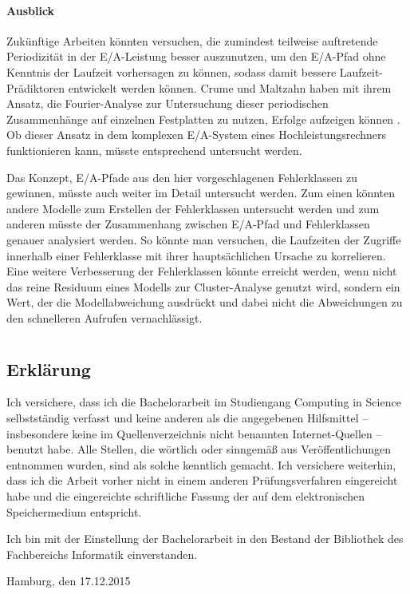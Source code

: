 \documentclass[
	12pt,
	a4paper,
	BCOR10mm,
	DIV14,
	listof=totoc,
	bibliography=totoc,
	headsepline
]{scrreprt}
\begin{document}
\subsubsection{Ausblick}
Zukünftige Arbeiten könnten versuchen, die zumindest teilweise auftretende Periodizität in der E/A-Leistung besser auszunutzen, um den E/A-Pfad ohne Kenntnis der Laufzeit vorhersagen zu können, sodass damit bessere Laufzeit-Prädiktoren entwickelt werden können. 
Crume und Maltzahn haben mit ihrem Ansatz, die Fourier-Analyse zur Untersuchung dieser periodischen Zusammenhänge auf einzelnen Festplatten zu nutzen, Erfolge aufzeigen können \cite{Crume:2013:FML:2538542.2538561}.
Ob dieser Ansatz in dem komplexen E/A-System eines Hochleistungsrechners funktionieren kann, müsste entsprechend untersucht werden.\medskip

Das Konzept, E/A-Pfade aus den hier vorgeschlagenen Fehlerklassen zu gewinnen, müsste auch weiter im Detail untersucht werden.
Zum einen könnten andere Modelle zum Erstellen der Fehlerklassen untersucht werden und zum anderen müsste der Zusammenhang zwischen E/A-Pfad und Fehlerklassen genauer analysiert werden. So könnte man versuchen, die Laufzeiten der Zugriffe innerhalb einer Fehlerklasse mit ihrer hauptsächlichen Ursache zu korrelieren.\\
Eine weitere Verbesserung der Fehlerklassen könnte erreicht werden, wenn nicht das reine Residuum eines Modells zur Cluster-Analyse genutzt wird, sondern ein Wert, der die Modellabweichung ausdrückt und dabei nicht die Abweichungen zu den schnelleren Aufrufen vernachlässigt.




\listoffigures

\listoftables

\newpage

\thispagestyle{empty}

\chapter*{}

\section*{Erklärung}

Ich versichere, dass ich die Bachelorarbeit im Studiengang Computing in Science
selbstständig verfasst und keine anderen als die angegebenen Hilfsmittel –
insbesondere keine im Quellenverzeichnis nicht benannten Internet-Quellen –
benutzt habe. Alle Stellen, die wörtlich oder sinngemäß aus Veröffentlichungen
entnommen wurden, sind als solche kenntlich gemacht. Ich versichere weiterhin,
dass ich die Arbeit vorher nicht in einem anderen Prüfungsverfahren eingereicht
habe und die eingereichte schriftliche Fassung der auf dem elektronischen
Speichermedium entspricht.\medskip

Ich bin mit der Einstellung der Bachelorarbeit in den Bestand der Bibliothek des Fachbereichs Informatik einverstanden.

\bigskip
\bigskip
\bigskip

Hamburg, den 17.12.2015  \quad \dotfill
\end{document}
